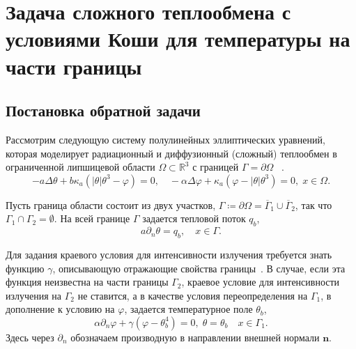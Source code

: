 \section{Задача сложного теплообмена с условиями Коши для температуры на части границы}
\label{sec:ch2/sec4}

\subsection{Постановка обратной задачи}\label{subsec:ch2/sec4/state}

Рассмотрим следующую систему полулинейных эллиптических уравнений, которая
моделирует радиационный и диффузионный (сложный) теплообмен в
ограниченной липшицевой области $\Omega\subset \mathbb{R}^3$ с границей
$\Gamma=\partial\Omega$ ~\cite{Pinnau2007, Kovtanyuk2014a}.
\begin{equation}
    \label{eq:2_4:eq1}
    - a\Delta\theta + b\kappa_a(|\theta|\theta^3- \varphi)=0,   \quad
    -\alpha \Delta \varphi + \kappa_a(\varphi-|\theta|\theta^3)=0,\; x\in\Omega.
\end{equation}

Пусть граница области состоит из двух участков,
$\Gamma \coloneqq \partial \Omega =\overline{\Gamma}_1 \cup \overline{\Gamma}_2$,
так что $\Gamma_1 \cap \Gamma_2 =  \emptyset$.
На всей границе $\Gamma$ задается тепловой поток $q_b$,
\begin{equation}
    \label{eq:2_4:bc1}
    a\partial_n\theta = q_b, \quad x\in \Gamma.
\end{equation}

Для задания краевого условия для интенсивности излучения
требуется знать функцию $\gamma$, описывающую отражающие свойства границы~\cite{JVM-14}.
В случае, если эта функция неизвестна на части границы $\Gamma_2$,
краевое условие для интенсивности излучения на $\Gamma_2$ не ставится, а в качестве условия
переопределения на $\Gamma_1$, в дополнение к условию на
$\varphi$, задается температурное поле $\theta_b$,
\begin{equation}
    \label{eq:2_4:bc2}
    \alpha\partial_n\varphi + \gamma (\varphi - \theta_b ^4 ) = 0,\;
    \theta=\theta_b\quad x\in \Gamma_1.
\end{equation}
Здесь через $\partial_n$ обозначаем производную в направлении
внешней нормали $\mathbf n$.

